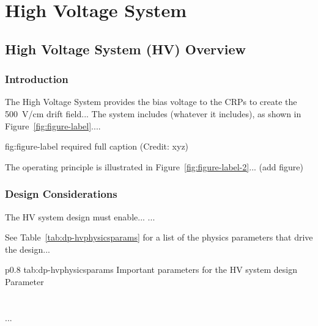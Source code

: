 \chapter{High Voltage System}
\label{ch:fddp-hv}

\section{High Voltage System (HV) Overview}
\label{sec:fddp-hv-ov}


\subsection{Introduction}
\label{sec:fddp-hv-intro}

The High Voltage System provides the bias voltage to the CRPs to create the \SI{500}{V/cm} drift field...
The system includes (whatever it includes), as shown in Figure~\ref{fig:figure-label}.... 



\begin{dunefigure}{fig:figure-label}
{required full caption (Credit: xyz)}
\end{dunefigure}

The operating principle is illustrated in Figure~\ref{fig:figure-label-2}... (add figure)


\subsection{Design Considerations}
\label{sec:fddp-hv-des-consid}


The HV system design must enable... 
...


See Table~\ref{tab:dp-hvphysicsparams} for a list of the physics parameters that drive the design...

\begin{dunetable}
{p{0.8\textwidth}}
{tab:dp-hvphysicsparams}
{Important parameters for the HV system design}   
Parameter  \\ \toprowrule
  \\ \colhline
   \\ \colhline
 ...\\ 
\end{dunetable}

